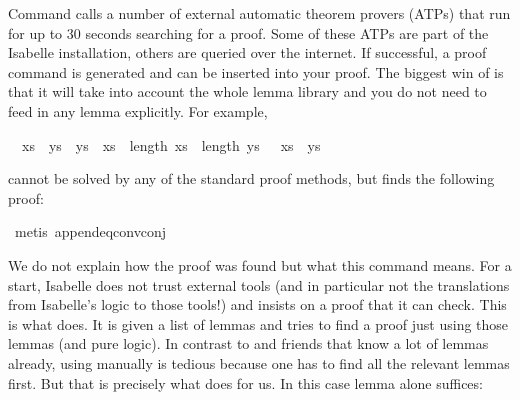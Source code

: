 \begin{isabellebody}
\begin{isamarkuptext}
Command  calls a number of external automatic
theorem provers (ATPs) that run for up to 30 seconds searching for a
proof. Some of these ATPs are part of the Isabelle installation, others are
queried over the internet. If successful, a proof command is generated and can
be inserted into your proof.  The biggest win of  is
that it will take into account the whole lemma library and you do not need to
feed in any lemma explicitly. For example,%
\end{isamarkuptext}%
\isamarkuptrue%
\isamarkupfalse%
\ {}{}\ xs\ {}\ ys\ {}\ ys\ {}\ xs{}\ \ length\ xs\ {}\ length\ ys\ {}\ {}\ xs\ {}\ ys{}%
\isadelimproof
%
\endisadelimproof
%
\isatagproof
%
\begin{isamarkuptxt}%
cannot be solved by any of the standard proof methods, but
 finds the following proof:%
\end{isamarkuptxt}%
\isamarkuptrue%
\isamarkupfalse%
\ {}metis\ append{}eq{}conv{}conj{}%
\endisatagproof
{\isafoldproof}%
%
\isadelimproof
%
\endisadelimproof
%
\begin{isamarkuptext}%
We do not explain how the proof was found but what this command
means. For a start, Isabelle does not trust external tools (and in particular
not the translations from Isabelle's logic to those tools!)
and insists on a proof that it can check. This is what  does.
It is given a list of lemmas and tries to find a proof just using those lemmas
(and pure logic). In contrast to  and friends that know a lot of
lemmas already, using  manually is tedious because one has
to find all the relevant lemmas first. But that is precisely what
 does for us.
In this case lemma  alone suffices:
\begin{isabelle}%

\end{isabelle}
\end{isamarkuptext}
\end{isabellebody}

